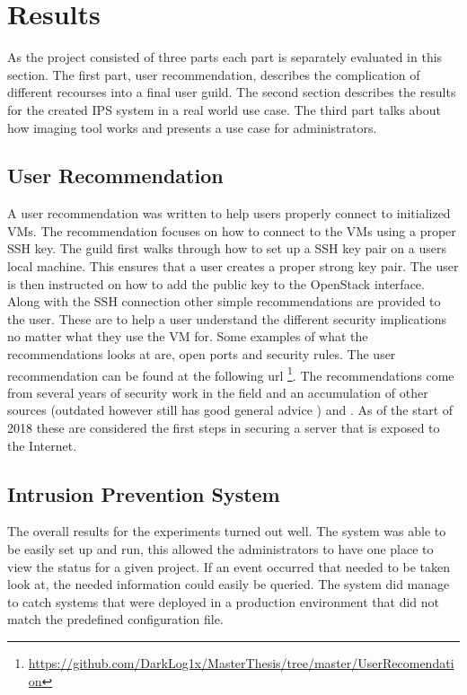 \documentclass[12pt]{article}
\begin{document}
\section{Results}
As the project consisted of three parts each part is separately evaluated in this section. The first part, user recommendation, describes the complication of different recourses into a final user guild. The second section describes the results for the created IPS system in a real world use case. The third part talks about how imaging tool works and presents a use case for administrators.

\subsection{User Recommendation}
A user recommendation was written to help users properly connect to initialized VMs. The recommendation focuses on how to connect to the VMs using a proper SSH key. The guild first walks through how to set up a SSH key pair on a users local machine. This ensures that a user creates a proper strong key pair. The user is then instructed on how to add the public key to the OpenStack interface. Along with the SSH connection other simple recommendations are provided to the user. These are to help a user understand the different security implications no matter what they use the VM for. Some examples of what the recommendations looks at are, open ports and security rules. The user recommendation can be found at the following url \footnote{\href{https://github.com/DarkLog1x/MasterThesis/tree/master/UserRecomendation}{https://github.com/DarkLog1x/MasterThesis/tree/master/UserRecomendation}}. The recommendations come from several years of security work in the field and an accumulation of other sources (outdated however still has good general advice \cite{bauer2005linux}) and \cite{digOcesecure}. As of the start of 2018 these are considered the first steps in securing a server that is exposed to the Internet.

\subsection{Intrusion Prevention System}
The overall results for the experiments turned out well. The system was able to be easily set up and run, this allowed the administrators to have one place to view the status for a given project. If an event occurred that needed to be taken look at, the needed information could easily be queried. The system did manage to catch systems that were deployed in a production environment that did not match the predefined configuration file.
\end{document}

